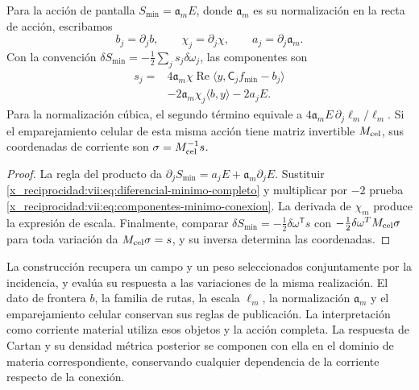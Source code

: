 \begin{theorem}
\label{x_reciprocidad:vii:thm:componentes-minimo-conexion}
Para la acción de pantalla
\(S_{\min}=\mathfrak a_m E\), donde \(\mathfrak a_m\) es su
normalización en la recta de acción, escribamos
\[
 b_j=\partial_jb,\qquad \chi_j=\partial_j\chi,
 \qquad a_j=\partial_j\mathfrak a_m.
\]
Con la convención \(\delta S_{\min}=-\tfrac12\sum_j s_j\delta\omega_j\),
las componentes son
\begin{equation}
 \begin{split}
 s_j={}&4\mathfrak a_m\chi\operatorname{Re}
             \langle y,\mathsf C_jf_{\min}-b_j\rangle\\
      &-2\mathfrak a_m\chi_j\langle b,y\rangle-2a_jE.
 \end{split}
 \label{x_reciprocidad:vii:eq:componentes-minimo-conexion}
\end{equation}
Para la normalización cúbica, el segundo término equivale a
\(4\mathfrak a_m E\,\partial_j\ell_m/\ell_m\).
Si el emparejamiento celular de esta misma acción tiene matriz
invertible \(\mathsf M_{\rm cel}\), sus coordenadas de corriente
son \(\sigma=\mathsf M_{\rm cel}^{-1}s\).
\end{theorem}

\begin{proof}
La regla del producto da
\(\partial_jS_{\min}=a_jE+\mathfrak a_m\partial_jE\).
Sustituir \eqref{x_reciprocidad:vii:eq:diferencial-minimo-completo} y multiplicar
por \(-2\) prueba \eqref{x_reciprocidad:vii:eq:componentes-minimo-conexion}.
La derivada de \(\chi_m\) produce la expresión de escala.
Finalmente, comparar
\(\delta S_{\min}=-\tfrac12\delta\omega^{\mathsf T}s\)
con \(-\tfrac12\delta\omega^{\mathsf T}\mathsf M_{\rm cel}\sigma\)
para toda variación da \(\mathsf M_{\rm cel}\sigma=s\),
y su inversa determina las coordenadas.
\end{proof}

La construcción recupera un campo y un peso seleccionados conjuntamente
por la incidencia, y evalúa su respuesta a las variaciones de la misma
realización. El dato de frontera \(b\), la familia de rutas, la escala
\(\ell_m\), la normalización \(\mathfrak a_m\) y el emparejamiento
celular conservan sus reglas de publicación. La interpretación como
corriente material utiliza esos objetos y la acción completa. La
respuesta de Cartan y su densidad métrica posterior se componen con
ella en el dominio de materia correspondiente, conservando cualquier
dependencia de la corriente respecto de la conexión.

